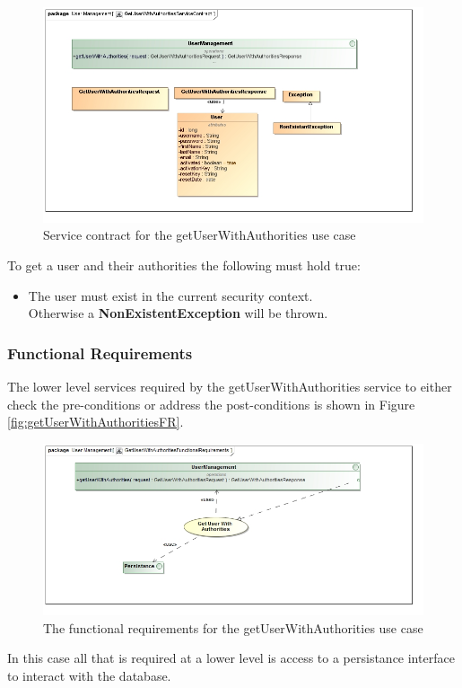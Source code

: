 \begin{figure}[H]
	\begin{center}
		\includegraphics[scale=0.55]{../Diagrams and Charts/Users/GetUserWithAuthoritiesServiceContract.jpg}
		\caption{Service contract for the getUserWithAuthorities use case}
		\label{fig:GetUserWithAuthoritiesServicesContract}
	\end{center}
\end{figure}

To get a user and their authorities the following must hold true:
\begin{itemize}
	\item The user must exist in the current security context.\\
	Otherwise a \textbf{NonExistentException} will be thrown.
\end{itemize}

\subsubsection{Functional Requirements}
The lower level services required by the getUserWithAuthorities service
to either check the pre-conditions or address the post-conditions is shown
in Figure \ref{fig:getUserWithAuthoritiesFR}.

\begin{figure}[H]
	\begin{center}
		\includegraphics[scale=0.5]{../Diagrams and Charts/Users/GetUserWithAuthoritiesFunctionalRequirements.jpg}
		\caption{The functional requirements for the getUserWithAuthorities use case}
		\label{getUserWithAuthoritiesFR}
	\end{center}	
\end{figure}

In this case all that is required at a lower level is access to a persistance
interface to interact with the database.